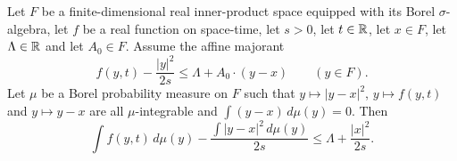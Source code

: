 \begin{lemma}
Let $F$ be a finite-dimensional real inner-product space equipped with its Borel
$\sigma$-algebra, let $f$ be a real function on space-time, let $s>0$, let
$t\in\mathbb{R}$, let $x\in F$, let $\Lambda\in\mathbb{R}$ and let $A_0\in F$. Assume the affine
majorant
\begin{equation}\label{eq:bami-major}
  f(y,t)-\frac{|y|^2}{2s}\le\Lambda+A_0\cdot(y-x)\qquad(y\in F).
\end{equation}
Let $\mu$ be a Borel probability measure on $F$ such that $y\mapsto|y-x|^2$,
$y\mapsto f(y,t)$ and $y\mapsto y-x$ are all $\mu$-integrable and
$\int(y-x)\,d\mu(y)=0$. Then
\[
  \int f(y,t)\,d\mu(y)-\frac{\int|y-x|^2\,d\mu(y)}{2s}
   \le\Lambda+\frac{|x|^2}{2s}.
\]
\end{lemma}
